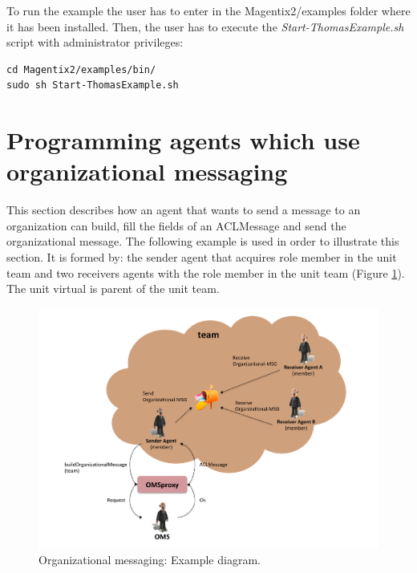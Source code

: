 To run the example the user has to enter in the Magentix2/examples folder where it has been installed. Then, the user has to execute the \textit{Start-ThomasExample.sh} script with administrator privileges:

\begin{lstlisting}
cd Magentix2/examples/bin/
sudo sh Start-ThomasExample.sh
\end{lstlisting}


\section{Programming agents which use organizational messaging}



This section describes how an agent that wants to send a message to an organization
can build, fill the fields of an ACLMessage and send the organizational message.
The following example is used in order to illustrate this section. It is formed by: the sender agent that acquires role member in the unit team
and two receivers agents with the role member in the unit team (Figure \ref{fig:org1}). The unit virtual is parent of the unit team.

\begin{figure}[h!t]
	\centering
	\includegraphics[width=1\textwidth]{Thomas/images/org.pdf}
	\caption{Organizational messaging: Example diagram.}
	\label{fig:org1}
\end{figure}


